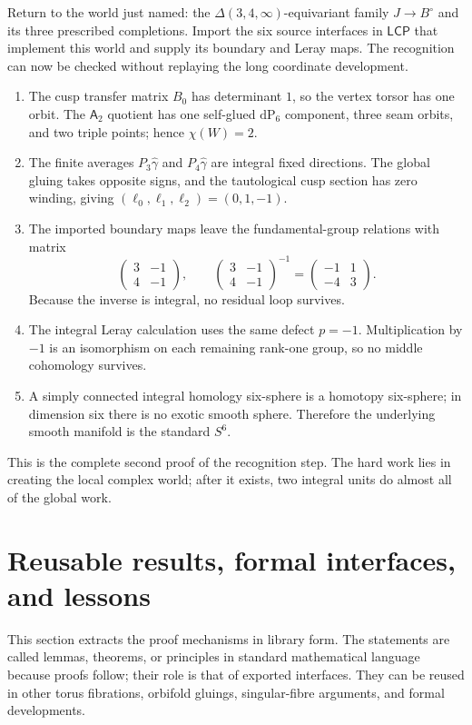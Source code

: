\documentclass[11pt,reqno]{amsart}
\numberwithin{equation}{section}
\newcommand{\dP}{\mathrm{dP}_6}
\newcommand{\wideg}{\widehat\gamma}
\newcommand{\LCP}{\mathsf{LCP}}
\newcommand{\Aroot}{\mathsf{A}_2}
\theoremstyle{definition}
\begin{document}
Return to the world just named: the $\Delta(3,4,\infty)$-equivariant family $J\to B^\circ$ and its three prescribed completions. Import the six source interfaces in $\LCP$ that implement this world and supply its boundary and Leray maps. The recognition can now be checked without replaying the long coordinate development.
\begin{enumerate}
\item The cusp transfer matrix $B_0$ has determinant $1$, so the vertex torsor has one orbit. The $\Aroot$ quotient has one self-glued $\dP$ component, three seam orbits, and two triple points; hence $\chi(W)=2$.
\item The finite averages $P_3\wideg$ and $P_4\wideg$ are integral fixed directions. The global gluing takes opposite signs, and the tautological cusp section has zero winding, giving $(\ell_0,\ell_1,\ell_2)=(0,1,-1)$.
\item The imported boundary maps leave the fundamental-group relations with matrix
\[
\begin{pmatrix}3&-1\\4&-1\end{pmatrix},
\qquad
\begin{pmatrix}3&-1\\4&-1\end{pmatrix}^{-1}
=
\begin{pmatrix}-1&1\\-4&3\end{pmatrix}.
\]
Because the inverse is integral, no residual loop survives.
\item The integral Leray calculation uses the same defect $p=-1$. Multiplication by $-1$ is an isomorphism on each remaining rank-one group, so no middle cohomology survives.
\item A simply connected integral homology six-sphere is a homotopy six-sphere; in dimension six there is no exotic smooth sphere. Therefore the underlying smooth manifold is the standard $S^6$.
\end{enumerate}
This is the complete second proof of the recognition step. The hard work lies in creating the local complex world; after it exists, two integral units do almost all of the global work.

\section{Reusable results, formal interfaces, and lessons}\label{sec:lemmas}

This section extracts the proof mechanisms in library form. The statements are called lemmas, theorems, or principles in standard mathematical language because proofs follow; their role is that of exported interfaces. They can be reused in other torus fibrations, orbifold gluings, singular-fibre arguments, and formal developments.
\end{document}
